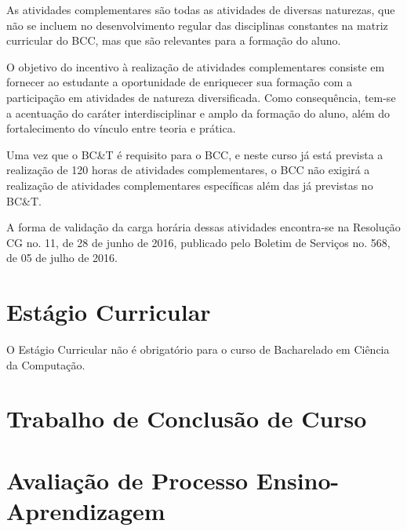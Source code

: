 \documentclass{article}
\begin{document}
As atividades complementares são todas as atividades de diversas naturezas, que não se incluem no desenvolvimento regular das disciplinas constantes na matriz curricular do BCC, mas que são relevantes para a formação do aluno.

O objetivo do incentivo à realização de atividades complementares consiste em fornecer ao estudante a oportunidade de enriquecer sua formação com a participação em atividades de natureza diversificada. Como consequência, tem-se a acentuação do caráter interdisciplinar e amplo da formação do aluno, além do fortalecimento do vínculo entre teoria e prática.

Uma vez que o BC\&T é requisito para o BCC, e neste curso já está prevista a realização de 120 horas de atividades complementares, o BCC não exigirá a realização de atividades complementares específicas além das já previstas no BC\&T. 

A forma de validação da carga horária dessas atividades encontra-se na Resolução CG no. 11, de 28 de junho de 2016, publicado pelo Boletim de Serviços no. 568, de 05 de julho de 2016.

\newpage
\section {Estágio Curricular}

O Estágio Curricular não é obrigatório para o curso de Bacharelado em Ciência da Computação.

\newpage
\section {Trabalho de Conclusão de Curso}

\newpage
\section {Avaliação de Processo Ensino-Aprendizagem}
\end{document}
